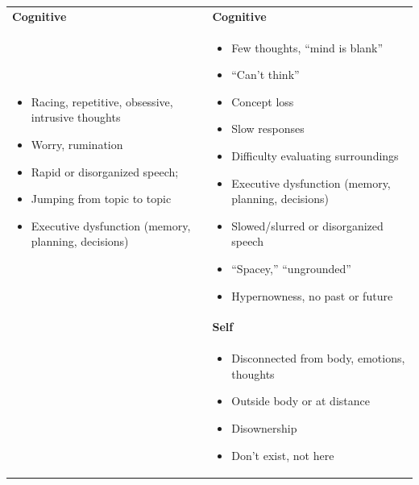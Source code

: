 \documentclass[11pt,oneside]{book}
\newenvironment{compactitemize}
{\begin{itemize}[nosep, leftmargin=1em, itemsep=0pt, topsep=0pt]}
{\end{itemize}}
\begin{document}
\begin{longtable}{>{\raggedright\arraybackslash}p{}|>{\raggedright\arraybackslash}p{}}
\addlinespace[1em]
\textbf{Cognitive} & \textbf{Cognitive} \\
\begin{compactitemize}
\item Racing, repetitive, obsessive, intrusive thoughts
\item Worry, rumination
\item Rapid or disorganized speech;
\item Jumping from topic to topic
\item Executive dysfunction (memory, planning, decisions)
\end{compactitemize}
&
\begin{compactitemize}
\item Few thoughts, \enquote{mind is blank}
\item \enquote{Can't think}
\item Concept loss
\item Slow responses
\item Difficulty evaluating surroundings
\item Executive dysfunction (memory, planning, decisions)
\item Slowed/slurred or disorganized speech
\item \enquote{Spacey,} \enquote{ungrounded}
\item Hypernowness, no past or future
\end{compactitemize} \\

\addlinespace[1em]
& \textbf{Self} \\
&
\begin{compactitemize}
\item Disconnected from body, emotions, thoughts
\item Outside body or at distance
\item Disownership
\item Don't exist, not here
\end{compactitemize} \\


\end{longtable}
\end{document}
